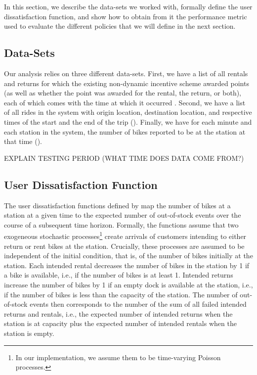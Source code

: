 In this section, we describe the data-sets we worked with, formally define the user dissatisfaction function, and show how to obtain from it the performance metric used to evaluate the different policies that we will define in the next section.

\subsection{Data-Sets}

Our analysis relies on three different data-sets. First, we have a list of all rentals and returns for which the existing non-dynamic incentive scheme awarded points (as well as whether the point was awarded for the rental, the return, or both), each of which comes with the time at which it occurred \cite{citibikeInternal}. Second, we have a list of all rides in the system with origin location, destination location, and respective times of the start and the end of the trip (\cite{citibikedata}). Finally, we have for each minute and each station in the system, the number of bikes reported to be at the station at that time (\cite{citibikejson}).

EXPLAIN TESTING PERIOD (WHAT TIME DOES DATA COME FROM?)

\subsection{User Dissatisfaction Function}\label{ssec:udf}
The user dissatisfaction functions defined by \cite{raviv2013optimal} map the number of bikes at a station at a given time to the expected number of out-of-stock events over the course of a subsequent time horizon. Formally, the functions assume that two exogeneous stochastic processes\footnote{In our implementation, we assume them to be time-varying Poisson processes.} create arrivals of customers intending to either return or rent bikes at the station. Crucially, these processes are assumed to be independent of the initial condition, that is, of the number of bikes initially at the station. Each intended rental decreases the number of bikes in the station by 1 if a bike is available, i.e., if the number of bikes is at least 1. Intended returns increase the number of bikes by 1 if an empty dock is available at the station, i.e., if the number of bikes is less than the capacity of the station. The number of out-of-stock events then corresponds to the number of the sum of all failed intended returns and rentals, i.e., the expected number of intended returns  when the station is at capacity plus the expected number of intended rentals when the station is empty.

